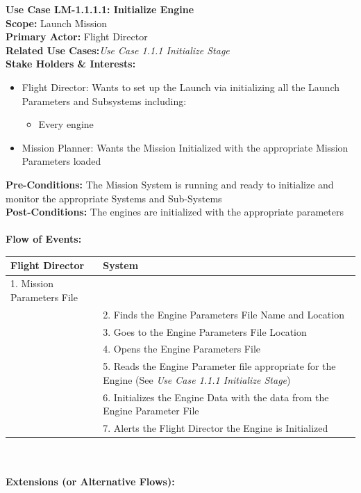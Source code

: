 \documentclass[letterpaper]{article}
\begin{document}
\noindent
\textbf{Use Case LM-1.1.1.1:  Initialize Engine}\\
\textbf{Scope:} Launch Mission\\
\textbf{Primary Actor:} Flight Director\\
\textbf{Related Use Cases:}\textit{Use Case 1.1.1 Initialize Stage}\\
\textbf{Stake Holders \& Interests:}
\begin{itemize}
   \item Flight Director:  Wants to set up the Launch via initializing
      all the Launch Parameters and Subsystems including:
      \begin{itemize}
         \item Every engine
      \end{itemize}
   \item Mission Planner:  Wants the Mission Initialized with the 
      appropriate Mission Parameters loaded
\end{itemize}
\textbf{Pre-Conditions:}  The Mission System is running and ready to
initialize and monitor the appropriate Systems and Sub-Systems\\
\textbf{Post-Conditions:} The engines are initialized with the
appropriate parameters\\\\
\textbf{Flow of Events:}\\
\begin{tabular}{|p{5.75cm}|p{5.75cm}|}\hline
   \textbf{Flight Director}&\textbf{System}\\\hline
   1.   Mission Parameters File&\\\hline
   &2.  Finds the Engine Parameters File Name and Location\\\hline
   &3.  Goes to the Engine Parameters File Location\\\hline
   &4.  Opens the Engine Parameters File\\\hline
   &5.  Reads the Engine Parameter file appropriate for the Engine
   (See \textit{Use Case 1.1.1 Initialize Stage})\\\hline
   &6.  Initializes the Engine Data with the data from the Engine
   Parameter File\\\hline
   &7.  Alerts the Flight Director the Engine is Initialized\\\hline
\end{tabular}\\\\
\textbf{Extensions (or Alternative Flows):}
\end{document}
